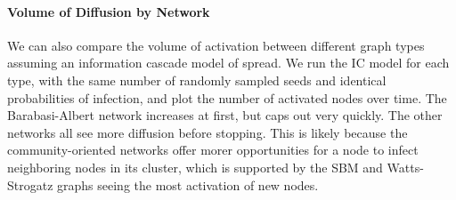 \documentclass[11pt]{article}
\begin{document}
    \hypertarget{volume-of-diffusion-by-network}{%
\paragraph{Volume of Diffusion by
Network}\label{volume-of-diffusion-by-network}}

    We can also compare the volume of activation between different graph
types assuming an information cascade model of spread. We run the IC
model for each type, with the same number of randomly sampled seeds and
identical probabilities of infection, and plot the number of activated
nodes over time. The Barabasi-Albert network increases at first, but
caps out very quickly. The other networks all see more diffusion before
stopping. This is likely because the community-oriented networks offer
morer opportunities for a node to infect neighboring nodes in its
cluster, which is supported by the SBM and Watts-Strogatz graphs seeing
the most activation of new nodes.
\end{document}
